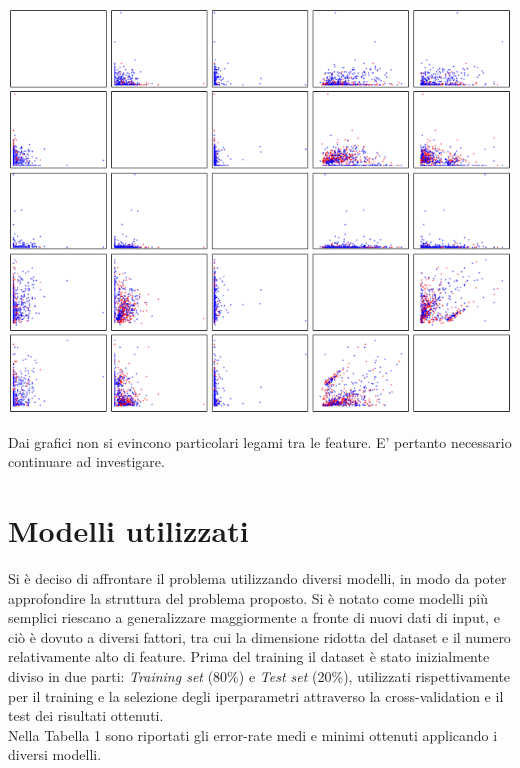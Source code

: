 \documentclass[a4paper,8pt]{article}
\newenvironment{Figure}
  {\par\medskip\noindent\minipage{\linewidth}}
  {\endminipage\par\medskip}
\begin{document}
\begin{multicols}{2}
\begin{Figure}
 \centering
 \includegraphics[width=\linewidth]{mcov}
\end{Figure}

Dai grafici non si evincono particolari legami tra le feature. E' pertanto necessario continuare ad investigare. %
\section{Modelli utilizzati}
Si è deciso di affrontare il problema utilizzando diversi modelli, in modo da poter approfondire la struttura del problema proposto. Si è notato come modelli più semplici riescano a generalizzare maggiormente a fronte di nuovi dati di input, e ciò è dovuto a diversi fattori, tra cui la dimensione ridotta del dataset e il numero relativamente alto di feature.
Prima del training il dataset è stato inizialmente diviso in due parti: \emph{Training set} (80\%) e \emph{Test set} (20\%), utilizzati rispettivamente per il training e la selezione degli iperparametri attraverso la cross-validation e il test dei risultati ottenuti.\\
Nella Tabella 1 sono riportati gli error-rate medi e minimi ottenuti applicando i diversi modelli.\\


\end{multicols}
\end{document}

